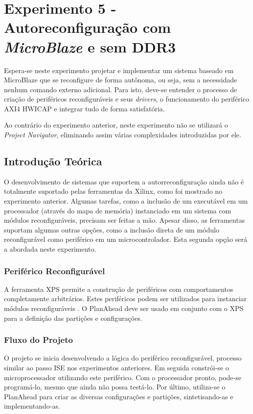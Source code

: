 \documentclass[11pt,a4paper,oneside]{book}
\begin{document}
\chapter{Experimento 5 - Autoreconfiguração com \textit{MicroBlaze} e sem DDR3}
Espera-se neste experimento projetar e implementar um sistema baseado em MicroBlaze que se reconfigure de forma autônoma, ou seja, sem a necessidade nenhum comando externo adicional.
Para isto, deve-se entender o processo de criação de periféricos reconfiguráveis e seus \textit{drivers}, o funcionamento do periférico AXI4 HWICAP e integrar tudo de forma satisfatória.

Ao contrário do experimento anterior, neste experimento não se utilizará o \textit{Project Navigator}, eliminando assim várias complexidades introduzidas por ele.

\section{Introdução Teórica}
O desenvolvimento de sistemas que suportem a autorreconfiguração ainda não é totalmente suportado pelas ferramentas da Xilinx, como foi mostrado no experimento anterior.
Algumas tarefas, como a inclusão de um executável em um processador (através do mapa de memória) instanciado em um sistema com módulos reconfiguráveis, precisam ser feitas a mão.
Apesar disso, as ferramentas suportam algumas outras opções, como a inclusão direta de um módulo reconfigurável como periférico em um microcontrolador.
Esta segunda opção será a abordada neste experimento.

\subsection{Periférico Reconfigurável}
A ferramenta XPS permite a construção de periféricos com comportamentos completamente arbitrários.
Estes periféricos podem ser utilizados para instanciar módulos reconfiguráveis \cite{ug744}.
O PlanAhead deve ser usado em conjunto com o XPS para a definição das partições e configurações.

\subsection{Fluxo do Projeto}
O projeto se inicia desenvolvendo a lógica do periférico reconfigurável, processo similar ao passo ISE nos experimentos anteriores.
Em seguida constrói-se o microprocessador utilizando este periférico.
Com o processador pronto, pode-se programá-lo, mesmo que ainda não possa testá-lo.
Por último, utiliza-se o PlanAhead para criar as diversas configurações e partições, sintetisando-as e implementando-as. 
\end{document}
